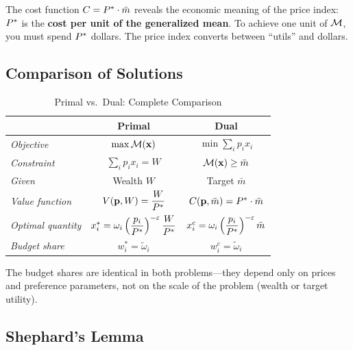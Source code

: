 \begin{calloutnote}
The cost function $C = P^{*} \cdot \bar{m}$ reveals the economic meaning of the price index: $P^{*}$ is the \textbf{cost per unit of the generalized mean}. To achieve one unit of $\mathcal{M}$, you must spend $P^{*}$ dollars. The price index converts between ``utils'' and dollars.
\end{calloutnote}

\subsection{Comparison of Solutions}
\label{subsec:comparison}

\begin{table}[H]
\centering
\caption{Primal vs.\ Dual: Complete Comparison}
\label{tab:primal-dual}
\renewcommand{\arraystretch}{1.6}
\begin{tabular}{@{}lcc@{}}
\toprule
& \textbf{Primal} & \textbf{Dual} \\
\midrule
\textit{Objective} & $\max \mathcal{M}(\mathbf{x})$ & $\min \sum_i p_i x_i$ \\[4pt]
\textit{Constraint} & $\sum_i p_i x_i = W$ & $\mathcal{M}(\mathbf{x}) \geq \bar{m}$ \\[4pt]
\textit{Given} & Wealth $W$ & Target $\bar{m}$ \\[4pt]
\textit{Value function} & $V(\mathbf{p}, W) = \dfrac{W}{P^{*}}$ & $C(\mathbf{p}, \bar{m}) = P^{*} \cdot \bar{m}$ \\[12pt]
\textit{Optimal quantity} & $x_i^* = \omega_i \left(\dfrac{p_i}{P^{*}}\right)^{-\varepsilon} \dfrac{W}{P^{*}}$ & $x_i^c = \omega_i \left(\dfrac{p_i}{P^{*}}\right)^{-\varepsilon} \bar{m}$ \\[12pt]
\textit{Budget share} & $w_i^* = \tilde{\omega}_i$ & $w_i^c = \tilde{\omega}_i$ \\[4pt]
\bottomrule
\end{tabular}
\end{table}

The budget shares are identical in both problems---they depend only on prices and preference parameters, not on the scale of the problem (wealth or target utility).

\subsection{Shephard's Lemma}
\label{subsec:shephard}

